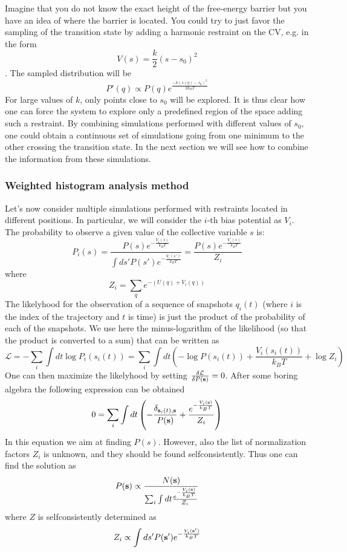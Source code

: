 Imagine that you do not know the exact height of the free-\/energy barrier but you have an idea of where the barrier is located. You could try to just favor the sampling of the transition state by adding a harmonic restraint on the C\+V, e.\+g. in the form \[ V(s)=\frac{k}{2} (s-s_0)^2 \]. The sampled distribution will be \[ P'(q)\propto P(q) e^{\frac{-k(s(q)-s_0)^2}{2k_BT}} \] For large values of $ k $, only points close to $ s_0 $ will be explored. It is thus clear how one can force the system to explore only a predefined region of the space adding such a restraint. By combining simulations performed with different values of $ s_0 $, one could obtain a continuous set of simulations going from one minimum to the other crossing the transition state. In the next section we will see how to combine the information from these simulations.\hypertarget{belfast-4_belfast-4-theory-wham}{}\subsubsection{Weighted histogram analysis method}\label{belfast-4_belfast-4-theory-wham}
Let's now consider multiple simulations performed with restraints located in different positions. In particular, we will consider the $i$-\/th bias potential as $V_i$. The probability to observe a given value of the collective variable $s$ is\+: \[ P_i({s})=\frac{P({s})e^{-\frac{V_i({s})}{k_BT}}}{\int ds' P({s}') e^{-\frac{V_i({s}')}{k_BT}}}= \frac{P({s})e^{-\frac{V_i({s})}{k_BT}}}{Z_i} \] where \[ Z_i=\sum_{q}e^{-\left(U(q)+V_i(q)\right)} \] The likelyhood for the observation of a sequence of snapshots $q_i(t)$ (where $i$ is the index of the trajectory and $t$ is time) is just the product of the probability of each of the snapshots. We use here the minus-\/logarithm of the likelihood (so that the product is converted to a sum) that can be written as \[ \mathcal{L}=-\sum_i \int dt \log P_i({s}_i(t))= \sum_i \int dt \left( -\log P({s}_i(t)) +\frac{V_i({s}_i(t))}{k_BT} +\log Z_i \right) \] One can then maximize the likelyhood by setting $\frac{\delta \mathcal{L}}{\delta P({\bf s})}=0$. After some boring algebra the following expression can be obtained \[ 0=\sum_{i}\int dt\left(-\frac{\delta_{{\bf s}_{i}(t),{\bf s}}}{P({\bf s})}+\frac{e^{-\frac{V_{i}({\bf s})}{k_{B}T}}}{Z_{i}}\right) \] In this equation we aim at finding $P(s)$. However, also the list of normalization factors $Z_i$ is unknown, and they should be found selfconsistently. Thus one can find the solution as \[ P({\bf s})\propto \frac{N({\bf s})}{\sum_i\int dt\frac{e^{-\frac{V_{i}({\bf s})}{k_{B}T}}}{Z_{i}} } \] where $Z$ is selfconsistently determined as \[ Z_i\propto\int ds' P({\bf s}') e^{-\frac{V_i({\bf s}')}{k_BT}} \]

